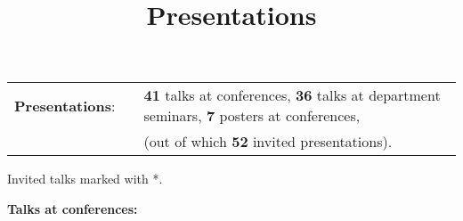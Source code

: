\documentclass[11pt,letterpaper,sans]{moderncv}   %
\title{Presentations}
\begin{document}
\pagestyle{headonly}

\maketitle


\begin{tabular}{rcl}
\textcolor{mark_color}{\textbf{Presentations}}: &\hspace{0.3cm} &{\textbf{41} talks at conferences}, {\textbf{36} talks at department seminars}, {\textbf{7} posters at conferences,} \\
& &{(out of which \textbf{52} invited presentations).}
\end{tabular}


\vspace{0.5cm}

Invited talks marked with *.
\vspace{0.2cm}

\textcolor{color1}{\textbf{Talks at conferences:}}
\vspace{-0.5cm}
\end{document}
